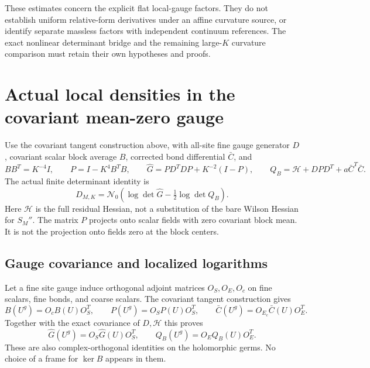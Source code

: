 \documentclass[11pt]{article}
\theoremstyle{remark}
\begin{document}
These estimates concern the explicit flat local-gauge factors.
They do not establish uniform relative-form derivatives under an
affine curvature source, or identify separate massless factors
with independent continuum references.
The exact nonlinear determinant bridge and the remaining
large-\(K\) curvature comparison must retain their own
hypotheses and proofs.



\section{Actual local densities in the covariant mean-zero gauge}
\label{cgd-section}

Use the covariant tangent construction above, with all-site
fine gauge generator \(D\), covariant scalar block average
\(B\), corrected bond differential \(\bar C\), and
\[
 BB^T=K^{-4}I,\qquad
 P=I-K^4B^TB,\qquad
 \widehat G=P D^TD P+K^{-2}(I-P),\qquad
 Q_B=\mathcal H+D P D^T+a\bar C^T\bar C.
\]
The actual finite determinant identity is
\begin{equation}
 D_{M,K}=\mathcal N_0
       \left(\log\det\widehat G-\tfrac12\log\det Q_B\right).
 \label{cgd-identity}
\end{equation}
Here \(\mathcal H\) is the full residual Hessian, not a
substitution of the bare Wilson Hessian for \(S_M''\).
The matrix \(P\) projects onto scalar fields with zero
covariant block mean. It is not the projection onto
fields zero at the block centers.

\subsection{Gauge covariance and localized logarithms}
\label{cgd-covariance-section}

Let a fine site gauge induce orthogonal adjoint matrices
\(O_S,O_E,O_c\) on fine scalars, fine bonds, and coarse
scalars. The covariant tangent construction gives
\[
 B(U^g)=O_c B(U)O_S^T,\qquad
 P(U^g)=O_S P(U)O_S^T,\qquad
 \bar C(U^g)=O_{E_c}\bar C(U)O_E^T.
\]
Together with the exact covariance of \(D,\mathcal H\)
this proves
\begin{equation}
 \widehat G(U^g)=O_S\widehat G(U)O_S^T,\qquad
 Q_B(U^g)=O_EQ_B(U)O_E^T.
 \label{cgd-covariance}
\end{equation}
These are also complex-orthogonal identities on the
holomorphic germs. No choice of a frame for \(\ker B\)
appears in them.
\end{document}
